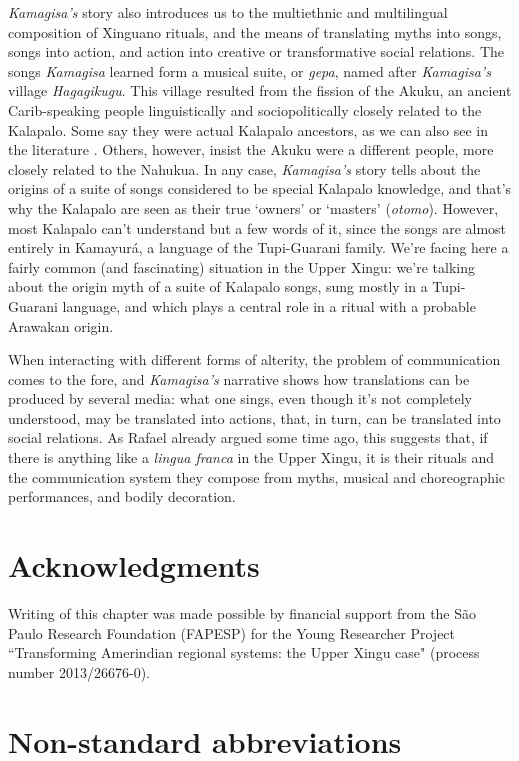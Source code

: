 \documentclass[output=paper,
modfonts,nonflat
]{langsci/langscibook}
\begin{document}
     \textit{Kamagisa's} story also introduces us to the multiethnic and multilingual composition of Xinguano rituals, and the means of translating myths into songs, songs into action, and action into creative or transformative social relations. The songs \textit{Kamagisa} learned form a musical suite, or \textit{gepa}, named after \textit{Kamagisa's} village \textit{Hagagikugu}. This village resulted from the fission of the Akuku, an ancient Carib-speaking people linguistically and sociopolitically closely related to the Kalapalo. Some say they were actual Kalapalo ancestors, as we can also see in the literature \citep{Basso2001}. Others, however, insist the Akuku were a different people, more closely related to the Nahukua. In any case, \textit{Kamagisa's} story tells about the origins of a suite of songs considered to be special Kalapalo knowledge, and that's why the Kalapalo are seen as their true ‘owners' or ‘masters' (\textit{otomo}). However, most Kalapalo can't understand but a few words of it, since the songs are almost entirely in Kamayurá, a language of the Tupi-Guarani family. We're facing here a fairly common (and fascinating) situation in the Upper Xingu: we're talking about the origin myth of a suite of Kalapalo songs, sung mostly in a Tupi-Guarani language, and which plays a central role in a ritual with a probable Arawakan origin.

	When interacting with different forms of alterity, the problem of communication comes to the fore, and \textit{Kamagisa's} narrative shows how translations can be produced by several media: what one sings, even though it's not completely understood, may be translated into actions, that, in turn, can be translated into social relations. As Rafael \citet{Bastos1983,Bastos1983} already argued some time ago, this suggests that, if there is anything like a \textit{lingua franca} in the Upper Xingu, it is their rituals and the communication system they compose from myths, musical and choreographic performances, and bodily decoration.

\section*{Acknowledgments}
Writing of this chapter was made possible by financial support from the São Paulo Research Foundation (FAPESP) for the Young Researcher Project “Transforming Amerindian regional systems: the Upper Xingu case" (process number 2013/26676-0). 

\section*{Non-standard abbreviations}
\end{document}
